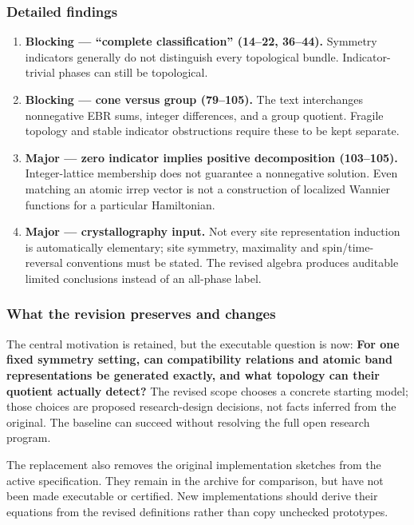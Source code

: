 \documentclass[
  11pt,
]{article}
\begin{document}
\subsubsection{Detailed findings}

\begin{enumerate}
\def\labelenumi{\arabic{enumi}.}
\item
  \textbf{Blocking --- ``complete classification'' (14--22, 36--44).}
  Symmetry indicators generally do not distinguish every topological
  bundle. Indicator-trivial phases can still be topological.
\item
  \textbf{Blocking --- cone versus group (79--105).} The text
  interchanges nonnegative EBR sums, integer differences, and a group
  quotient. Fragile topology and stable indicator obstructions require
  these to be kept separate.
\item
  \textbf{Major --- zero indicator implies positive decomposition
  (103--105).} Integer-lattice membership does not guarantee a
  nonnegative solution. Even matching an atomic irrep vector is not a
  construction of localized Wannier functions for a particular
  Hamiltonian.
\item
  \textbf{Major --- crystallography input.} Not every site
  representation induction is automatically elementary; site symmetry,
  maximality and spin/time-reversal conventions must be stated. The
  revised algebra produces auditable limited conclusions instead of an
  all-phase label.
\end{enumerate}

\subsubsection{What the revision preserves and changes}

The central motivation is retained, but the executable question is now:
\textbf{For one fixed symmetry setting, can compatibility relations and
atomic band representations be generated exactly, and what topology can
their quotient actually detect?} The revised scope chooses a concrete
starting model; those choices are proposed research-design decisions,
not facts inferred from the original. The baseline can succeed without
resolving the full open research program.

The replacement also removes the original implementation sketches from
the active specification. They remain in the archive for comparison, but
have not been made executable or certified. New implementations should
derive their equations from the revised definitions rather than copy
unchecked prototypes.
\end{document}
